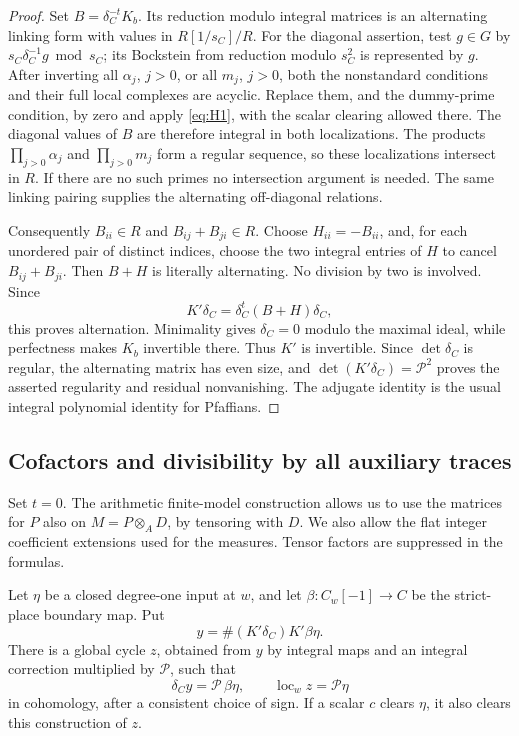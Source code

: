 \begin{proof}
Set \(B=\delta_C^{-t}K_b\). Its reduction modulo integral matrices is
an alternating linking form with values in \(R[1/s_C]/R\).
For the diagonal assertion, test \(g\in G\) by
\(s_C\delta_C^{-1}g\bmod s_C\); its Bockstein from reduction modulo
\(s_C^2\) is represented by \(g\). After inverting all \(\alpha_j\),
\(j>0\), or all \(m_j\), \(j>0\), both the nonstandard conditions
and their full local complexes are acyclic. Replace them, and the
dummy-prime condition, by zero and apply \eqref{eq:H1}, with the
scalar clearing allowed there. The diagonal values of \(B\) are
therefore integral in both localizations. The products
\(\prod_{j>0}\alpha_j\) and \(\prod_{j>0}m_j\) form a regular
sequence, so these localizations intersect in \(R\). If there are no
such primes no intersection argument is needed. The same linking
pairing supplies the alternating off-diagonal relations.

Consequently \(B_{ii}\in R\) and \(B_{ij}+B_{ji}\in R\). Choose
\(H_{ii}=-B_{ii}\), and, for each unordered pair of distinct indices,
choose the two integral entries of \(H\) to cancel
\(B_{ij}+B_{ji}\). Then \(B+H\) is literally alternating. No division
by two is involved. Since
\[
 K'\delta_C=\delta_C^t(B+H)\delta_C,
\]
this proves alternation. Minimality gives \(\delta_C=0\) modulo the
maximal ideal, while perfectness makes \(K_b\) invertible there.
Thus \(K'\) is invertible. Since \(\det\delta_C\) is regular, the
alternating matrix has even size, and
\(\det(K'\delta_C)=\mathcal P^2\) proves the asserted regularity
and residual nonvanishing. The adjugate identity is the usual
integral polynomial identity for Pfaffians.
\end{proof}

\subsection{Cofactors and divisibility by all auxiliary traces}

Set \(t=0\). The arithmetic finite-model construction allows us to
use the matrices for \(P\) also on \(M=P\otimes_A D\), by tensoring
with \(D\). We also allow the flat integer coefficient extensions
used for the measures. Tensor factors are suppressed in the formulas.

\begin{lemma}\label{real:cofactor-lift}
Let \(\eta\) be a closed degree-one input at \(w\), and let
\(\beta:C_w[-1]\to C\) be the strict-place boundary map. Put
\begin{equation}\label{real:lift-formula}
 y=\#(K'\delta_C)K'\beta\eta.
\end{equation}
There is a global cycle \(z\), obtained from \(y\) by integral maps
and an integral correction multiplied by \(\mathcal P\), such that
\[
 \delta_Cy=\mathcal P\,\beta\eta,
 \qquad \operatorname{loc}_w z=\mathcal P\eta
\]
in cohomology, after a consistent choice of sign. If a scalar \(c\)
clears \(\eta\), it also clears this construction of \(z\).
\end{lemma}

